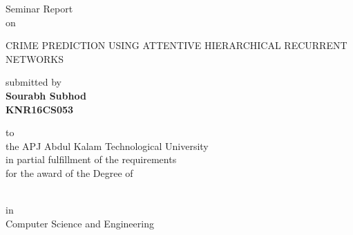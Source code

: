 
\newcommand{\jadafont}[1]{{\fontfamily{pzc}\selectfont {\large #1}}}

\begin{titlepage}
\begin{center}

	{ \LARGE Seminar Report }\\\medskip
	{ on }\\\bigskip
	{\LARGE CRIME PREDICTION USING ATTENTIVE HIERARCHICAL RECURRENT NETWORKS\par}	

\vspace{30px}


	{\sc submitted by}\\\medskip
	{\bf Sourabh Subhod} \\ \medskip
	{\bf KNR16CS053}
	
  \vspace{20px}
  to\\
  \vspace{20px}
  {\sc the APJ Abdul Kalam Technological University\\
  \vspace{10px}
  in partial fulfillment of the requirements \\
  \vspace{10px}
  for the award of the Degree of}\\
  \vspace{10px}
  {\jadafont{Bachelor of Technology}\\\medskip
    {\sc in \\ Computer Science and Engineering} 
  
}
\end{center}
\end{titlepage}
